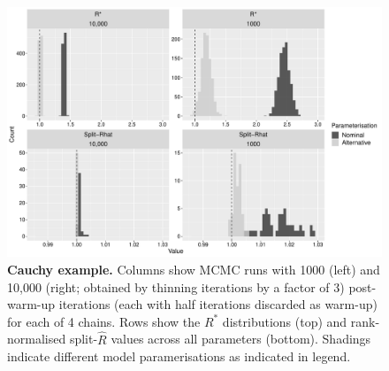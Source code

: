 \documentclass{article}
\begin{document}
\begin{figure}[!htb]
	\centerline{\includegraphics[width=1.0\textwidth]{../output/cauchy.pdf}}
	\caption{\textbf{Cauchy example.} Columns show MCMC runs with 1000 (left) and 10,000 (right; obtained by thinning iterations by a factor of 3) post-warm-up iterations (each with half iterations discarded as warm-up) for each of 4 chains. Rows show the $R^*$ distributions (top) and rank-normalised split-$\widehat{R}$ values across all parameters (bottom). Shadings indicate different model paramerisations as indicated in legend.}
	\label{fig:cauchy}
\end{figure}
\end{document}
